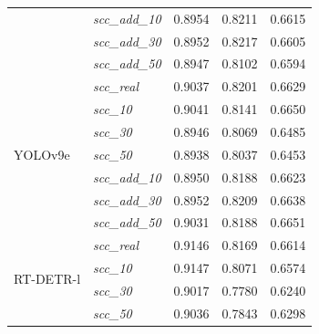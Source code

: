 \begin{table}[h!]
{\begin{tabular}{l|l|c|c|c}
                                      & \textit{scc\_add\_10}   & 0.8954                     & 0.8211                     & 0.6615                     \\
                                      & \textit{scc\_add\_30}   & 0.8952                     & \cellcolor{blue!10}0.8217  & 0.6605                     \\
                                      & \textit{scc\_add\_50}   & 0.8947                     & 0.8102                     & 0.6594                     \\
        \midrule
        \multirow[t]{7}{*}{YOLOv9e}   & \textit{scc\_real}      & 0.9037                     & 0.8201                     & 0.6629                     \\
                                      & \textit{scc\_10}        & \cellcolor{blue!10}0.9041  & 0.8141                     & 0.6650                     \\
                                      & \textit{scc\_30}        & 0.8946                     & 0.8069                     & 0.6485                     \\
                                      & \textit{scc\_50}        & 0.8938                     & 0.8037                     & 0.6453                     \\
                                      & \textit{scc\_add\_10}   & 0.8950                     & 0.8188                     & 0.6623                     \\
                                      & \textit{scc\_add\_30}   & 0.8952                     & \cellcolor{blue!10}0.8209  & 0.6638                     \\
                                      & \textit{scc\_add\_50}   & 0.9031                     & 0.8188                     & \cellcolor{blue!10}0.6651  \\
        \midrule
        \multirow[t]{7}{*}{RT-DETR-l} & \textit{scc\_real}      & 0.9146                     & \cellcolor{blue!10}0.8169  & \cellcolor{blue!10}0.6614  \\
                                      & \textit{scc\_10}        & \cellcolor{blue!10}0.9147  & 0.8071                     & 0.6574                     \\
                                      & \textit{scc\_30}        & 0.9017                     & 0.7780                     & 0.6240                     \\
                                      & \textit{scc\_50}        & 0.9036                     & 0.7843                     & 0.6298                     \\

\end{tabular}}
\end{table}

